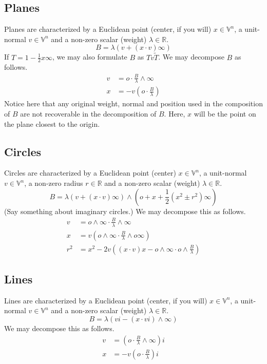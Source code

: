 \documentclass[12pt]{article}
\newcommand{\V}{\mathbb{V}}
\newcommand{\R}{\mathbb{R}}
\newcommand{\nvao}{o}
\newcommand{\nvai}{\infty}
\begin{document}
\subsection{Planes}

Planes are characterized by a Euclidean point (center, if you will) $x\in\V^n$,
a unit-normal $v\in\V^n$ and a non-zero scalar (weight) $\lambda\in\R$.
\begin{equation*}
B = \lambda(v + (x\cdot v)\nvai)
\end{equation*}
If $T=1-\frac{1}{2}x\nvai$, we may also formulate $B$ as $Tv\tilde{T}$.
We may decompose $B$ as follows.
\begin{align*}
v &= \nvao\cdot\frac{B}{\lambda}\wedge\nvai \\
x &= -v\left(\nvao\cdot\frac{B}{\lambda}\right)
\end{align*}
Notice here that any original weight, normal and position used in
the composition of $B$ are not recoverable in the decomposition of $B$.
Here, $x$ will be the point on the plane closest to the origin.

\subsection{Circles}

Circles are characterized by a Euclidean point (center) $x\in\V^n$,
a unit-normal $v\in\V^n$, a non-zero radius $r\in\R$ and a non-zero scalar (weight) $\lambda\in\R$.
\begin{equation*}
B = \lambda(v+(x\cdot v)\nvai)\wedge\left(\nvao+x+\frac{1}{2}(x^2\pm r^2)\nvai\right)
\end{equation*}
(Say something about imaginary circles.)  We may decompose this as follows.
\begin{align*}
v &= \nvao\wedge\nvai\cdot\frac{B}{\lambda}\wedge\nvai \\
x &= v\left(\nvao\wedge\nvai\cdot\frac{B}{\lambda}\wedge\nvao\nvai\right) \\
r^2 &= x^2 - 2v\left((x\cdot v)x-\nvao\wedge\nvai\cdot\nvao\wedge \frac{B}{\lambda}\right)
\end{align*}

\subsection{Lines}

Lines are characterized by a Euclidean point (center, if you will) $x\in\V^n$,
a unit-normal $v\in\V^n$ and a non-zero scalar (weight) $\lambda\in\R$.
\begin{equation*}
B = \lambda\left(vi - \left(x\cdot vi\right)\wedge\nvai\right)
\end{equation*}
We may decompose this as follows.
\begin{align*}
v &= \left(\nvao\cdot\frac{B}{\lambda}\wedge\nvai\right)i \\
x &= -v\left(\nvao\cdot\frac{B}{\lambda}\right)i
\end{align*}
\end{document}
